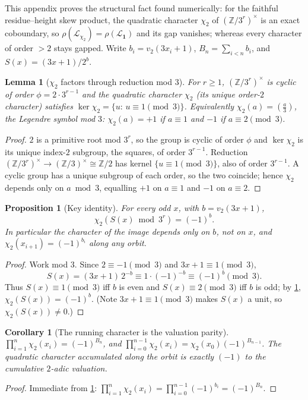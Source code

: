 \documentclass[11pt]{article}
\newcommand{\Z}{\mathbb{Z}}
\newcommand{\Lcal}{\mathcal{L}}
\theoremstyle{plain}
\newtheorem{lemma}{Lemma}
\newtheorem{proposition}{Proposition}
\newtheorem{corollary}{Corollary}
\theoremstyle{remark}
\begin{document}
This appendix proves the structural fact found numerically: for the faithful
residue--height skew product, the quadratic character $\chi_2$ of $(\Z/3^r)^\times$
is an exact coboundary, so $\rho(\Lcal_{\chi_2})=\rho(\Lcal_{\mathbf 1})$ and its
gap vanishes; whereas every character of order $>2$ stays gapped. Write
$b_i=v_2(3x_i+1)$, $B_n=\sum_{i<n}b_i$, and $S(x)=(3x+1)/2^{b}$.

\begin{lemma}[$\chi_2$ factors through reduction mod $3$]\label{lem:fac3}
For $r\ge1$, $(\Z/3^r)^\times$ is cyclic of order $\phi=2\cdot3^{r-1}$ and the
quadratic character $\chi_2$ (its unique order-$2$ character) satisfies
$\ker\chi_2=\{u:\,u\equiv1\!\!\pmod 3\}$. Equivalently $\chi_2(a)=\left(\tfrac a3\right)$,
the Legendre symbol mod $3$: $\chi_2(a)=+1$ if $a\equiv1$ and $-1$ if $a\equiv2\pmod3$.
\end{lemma}
\begin{proof}
$2$ is a primitive root mod $3^r$, so the group is cyclic of order $\phi$ and
$\ker\chi_2$ is its unique index-$2$ subgroup, the squares, of order $3^{r-1}$.
Reduction $(\Z/3^r)^\times\!\to(\Z/3)^\times\cong\Z/2$ has kernel
$\{u\equiv1\!\pmod3\}$, also of order $3^{r-1}$. A cyclic group has a unique
subgroup of each order, so the two coincide; hence $\chi_2$ depends only on
$a\bmod3$, equalling $+1$ on $a\equiv1$ and $-1$ on $a\equiv2$.
\end{proof}

\begin{proposition}[Key identity]\label{prop:key}
For every odd $x$, with $b=v_2(3x+1)$,
\[
\chi_2\!\left(S(x)\bmod 3^r\right)=(-1)^{b}.
\]
In particular the character of the image depends only on $b$, not on $x$, and
$\chi_2(x_{i+1})=(-1)^{b_i}$ along any orbit.
\end{proposition}
\begin{proof}
Work mod $3$. Since $2\equiv-1\pmod3$ and $3x+1\equiv1\pmod3$,
\[
S(x)=(3x+1)\,2^{-b}\equiv 1\cdot(-1)^{-b}\equiv(-1)^{b}\pmod 3 .
\]
Thus $S(x)\equiv1\pmod3$ iff $b$ is even and $S(x)\equiv2\pmod3$ iff $b$ is odd;
by \cref{lem:fac3}, $\chi_2(S(x))=(-1)^b$. (Note $3x+1\equiv1\pmod3$ makes $S(x)$ a
unit, so $\chi_2(S(x))\ne0$.)
\end{proof}

\begin{corollary}[The running character is the valuation parity]\label{cor:run}
$\displaystyle\prod_{i=1}^{n}\chi_2(x_i)=(-1)^{B_n}$, and
$\prod_{i=0}^{n-1}\chi_2(x_i)=\chi_2(x_0)(-1)^{B_{n-1}}$. The quadratic character
accumulated along the orbit is exactly $(-1)$ to the cumulative $2$-adic valuation.
\end{corollary}
\begin{proof}
Immediate from \cref{prop:key}: $\prod_{i=1}^n\chi_2(x_i)=\prod_{i=0}^{n-1}(-1)^{b_i}=(-1)^{B_n}$.
\end{proof}
\end{document}

